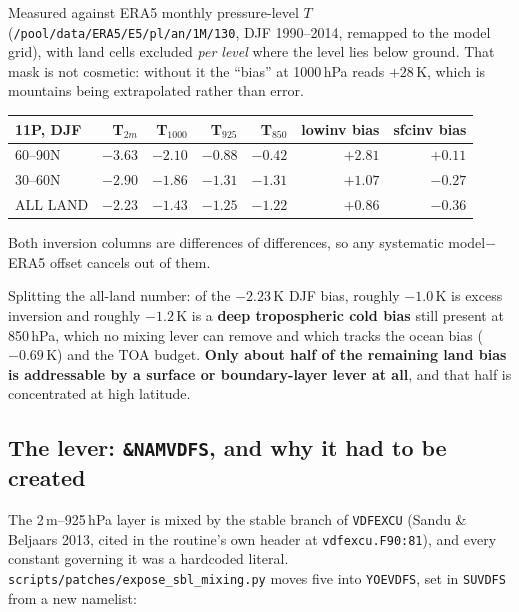 \documentclass[10pt]{article}
\begin{document}
Measured against ERA5 monthly pressure-level $T$
(\texttt{/pool/data/ERA5/E5/pl/an/1M/130}, DJF 1990--2014, remapped to the model grid),
with land cells excluded \emph{per level} where the level lies below ground. That mask is
not cosmetic: without it the ``bias'' at 1000\,hPa reads $+28$\,K, which is mountains
being extrapolated rather than error.

\begin{center}\small
\begin{tabular}{lrrrrrr}
\toprule
11P, DJF & T$_{2m}$ & T$_{1000}$ & T$_{925}$ & T$_{850}$ & lowinv bias & sfcinv bias \\
\midrule
60--90N  & $-3.63$ & $-2.10$ & $-0.88$ & $-0.42$ & $\mathbf{+2.81}$ & $\mathbf{+0.11}$ \\
30--60N  & $-2.90$ & $-1.86$ & $-1.31$ & $-1.31$ & $+1.07$ & $-0.27$ \\
ALL LAND & $-2.23$ & $-1.43$ & $-1.25$ & $-1.22$ & $+0.86$ & $-0.36$ \\
\bottomrule
\end{tabular}
\end{center}

Both inversion columns are differences of differences, so any systematic model$-$ERA5
offset cancels out of them.

Splitting the all-land number: of the $-2.23$\,K DJF bias, roughly $-1.0$\,K is excess
inversion and roughly $-1.2$\,K is a \textbf{deep tropospheric cold bias} still present at
850\,hPa, which no mixing lever can remove and which tracks the ocean bias ($-0.69$\,K)
and the TOA budget. \textbf{Only about half of the remaining land bias is addressable by
a surface or boundary-layer lever at all}, and that half is concentrated at high latitude.

\subsection{The lever: \texttt{\&NAMVDFS}, and why it had to be created}\label{sub:r31namvdfs}

The 2\,m--925\,hPa layer is mixed by the stable branch of \texttt{VDFEXCU} (Sandu \&
Beljaars 2013, cited in the routine's own header at \texttt{vdfexcu.F90:81}), and every
constant governing it was a hardcoded literal.
\texttt{scripts/patches/expose\_sbl\_mixing.py} moves five into \texttt{YOEVDFS}, set in
\texttt{SUVDFS} from a new namelist:
\end{document}
